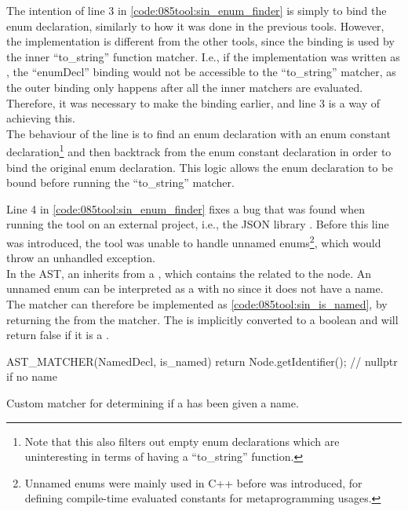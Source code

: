 The intention of line 3 in \cref{code:085tool:sin_enum_finder} is simply to bind the enum declaration, similarly to how it was done in the previous tools.
However, the implementation is different from the other tools, since the binding is used by the inner ``to\_string'' function matcher.
I.e., if the implementation was written as , the ``enumDecl'' binding would not be accessible to the ``to\_string'' matcher, as the outer binding only happens after all the inner matchers are evaluated.
Therefore, it was necessary to make the binding earlier, and line 3 is a way of achieving this.\\
The behaviour of the line is to find an enum declaration with an enum constant declaration\footnote{
    Note that this also filters out empty enum declarations which are uninteresting in terms of having a ``to\_string'' function.
} and then backtrack from the enum constant declaration in order to bind the original enum declaration. This logic allows the enum declaration to be bound before running the ``to\_string'' matcher.

Line 4 in \cref{code:085tool:sin_enum_finder} fixes a bug that was found when running the tool on an external project, i.e., the JSON library \cite{lohmannJSONModern2022}.
Before this line was introduced, the tool was unable to handle unnamed enums\footnote{
    Unnamed enums were mainly used in C++ before  was introduced, for defining compile-time evaluated constants for metaprogramming usages.
}, which would throw an unhandled exception.\\
In the AST, an  inherits from a , which contains the  related to the node.
An unnamed enum can be interpreted as a  with no  since it does not have a name.
The matcher can therefore be implemented as \cref{code:085tool:sin_is_named}, by returning the  from the matcher. The  is implicitly converted to a boolean and will return false if it is a .

\begin{listing}[H]
    \begin{cppcode}
AST_MATCHER(NamedDecl, is_named) {
	return Node.getIdentifier(); // nullptr if no name
}
    \end{cppcode}
    \caption{Custom matcher for determining if a  has been given a name.}
    \label{code:085tool:sin_is_named}
\end{listing}

